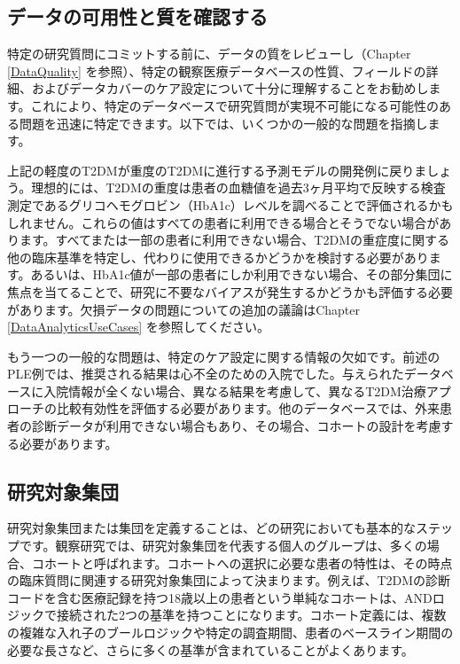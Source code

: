 \documentclass[
  11pt]{book}
\theoremstyle{definition}
\theoremstyle{definition}
\theoremstyle{definition}
\theoremstyle{definition}
\theoremstyle{remark}
\begin{document}
\subsection{データの可用性と質を確認する}\label{ux30c7ux30fcux30bfux306eux53efux7528ux6027ux3068ux8ceaux3092ux78baux8a8dux3059ux308b}

特定の研究質問にコミットする前に、データの質をレビューし（Chapter \ref{DataQuality} を参照）、特定の観察医療データベースの性質、フィールドの詳細、およびデータカバーのケア設定について十分に理解することをお勧めします。これにより、特定のデータベースで研究質問が実現不可能になる可能性のある問題を迅速に特定できます。以下では、いくつかの一般的な問題を指摘します。

上記の軽度のT2DMが重度のT2DMに進行する予測モデルの開発例に戻りましょう。理想的には、T2DMの重度は患者の血糖値を過去3ヶ月平均で反映する検査測定であるグリコヘモグロビン（HbA1c）レベルを調べることで評価されるかもしれません。これらの値はすべての患者に利用できる場合とそうでない場合があります。すべてまたは一部の患者に利用できない場合、T2DMの重症度に関する他の臨床基準を特定し、代わりに使用できるかどうかを検討する必要があります。あるいは、HbA1c値が一部の患者にしか利用できない場合、その部分集団に焦点を当てることで、研究に不要なバイアスが発生するかどうかも評価する必要があります。欠損データの問題についての追加の議論はChapter \ref{DataAnalyticsUseCases} を参照してください。

もう一つの一般的な問題は、特定のケア設定に関する情報の欠如です。前述のPLE例では、推奨される結果は心不全のための入院でした。与えられたデータベースに入院情報が全くない場合、異なる結果を考慮して、異なるT2DM治療アプローチの比較有効性を評価する必要があります。他のデータベースでは、外来患者の診断データが利用できない場合もあり、その場合、コホートの設計を考慮する必要があります。

\subsection{研究対象集団}\label{ux7814ux7a76ux5bfeux8c61ux96c6ux56e3}

研究対象集団または集団を定義することは、どの研究においても基本的なステップです。観察研究では、研究対象集団を代表する個人のグループは、多くの場合、コホートと呼ばれます。コホートへの選択に必要な患者の特性は、その時点の臨床質問に関連する研究対象集団によって決まります。例えば、T2DMの診断コードを含む医療記録を持つ18歳以上の患者という単純なコホートは、ANDロジックで接続された2つの基準を持つことになります。コホート定義には、複数の複雑な入れ子のブールロジックや特定の調査期間、患者のベースライン期間の必要な長さなど、さらに多くの基準が含まれていることがよくあります。
\end{document}
